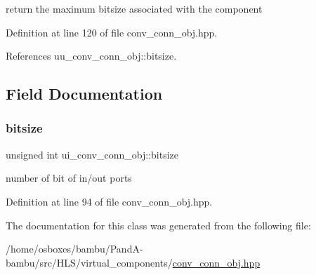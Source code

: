 return the maximum bitsize associated with the component 



Definition at line 120 of file conv\+\_\+conn\+\_\+obj.\+hpp.



References uu\+\_\+conv\+\_\+conn\+\_\+obj\+::bitsize.



\subsection{Field Documentation}
\mbox{\label{classui__conv__conn__obj_a93d49404d4f4b710b7d8fb9d5aa4f0dc}} 
\subsubsection{\texorpdfstring{bitsize}{bitsize}}
{\footnotesize\ttfamily unsigned int ui\+\_\+conv\+\_\+conn\+\_\+obj\+::bitsize\hspace{0.3cm}{\ttfamily [private]}}



number of bit of in/out ports 



Definition at line 94 of file conv\+\_\+conn\+\_\+obj.\+hpp.



The documentation for this class was generated from the following file\+:\begin{DoxyCompactItemize}
\item 
/home/osboxes/bambu/\+Pand\+A-\/bambu/src/\+H\+L\+S/virtual\+\_\+components/\hyperlink{conv__conn__obj_8hpp}{conv\+\_\+conn\+\_\+obj.\+hpp}\end{DoxyCompactItemize}
